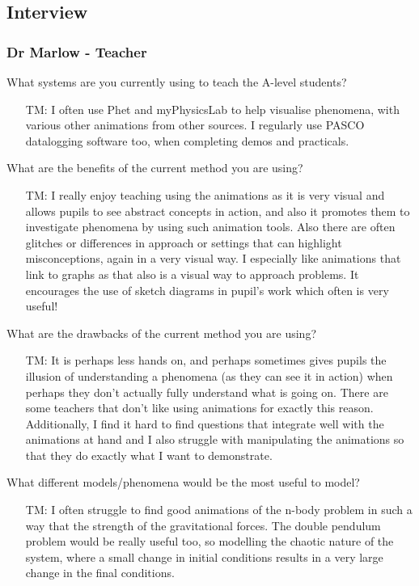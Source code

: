 \documentclass[12pt]{article}
\begin{document}
\newpage
\subsection{Interview}
\subsubsection{Dr Marlow - Teacher}

What systems are you currently using to teach the A-level students?
\begin{itemize}
    \item[TM: ] I often use Phet and myPhysicsLab to help visualise phenomena, with various other animations from other sources. I regularly use PASCO datalogging software too, when completing demos and practicals.
\end{itemize}
What are the benefits of the current method you are using?
\begin{itemize}
    \item[TM: ] I really enjoy teaching using the animations as it is very visual and allows pupils to see abstract concepts in action, and also it promotes them to investigate phenomena by using such animation tools. Also there are often glitches or differences in approach or settings that can highlight misconceptions, again in a very visual way. I especially like animations that link to graphs as that also is a visual way to approach problems. It encourages the use of sketch diagrams in pupil's work which often is very useful! 
\end{itemize}
What are the drawbacks of the current method you are using?
\begin{itemize}
    \item[TM: ] It is perhaps less hands on, and perhaps sometimes gives pupils the illusion of understanding a phenomena (as they can see it in action) when perhaps they don't actually fully understand what is going on. There are some teachers that don't like using animations for exactly this reason. Additionally, I find it hard to find questions that integrate well with the animations at hand and I also struggle with manipulating the animations so that they do exactly what I want to demonstrate.
\end{itemize}
What different models/phenomena would be the most useful to model?
\begin{itemize}
    \item[TM: ] I often struggle to find good animations of the n-body problem in such a way that the strength of the gravitational forces. The double pendulum problem would be really useful too, so modelling the chaotic nature of the system, where a small change in initial conditions results in a very large change in the final conditions.
\end{itemize}
\end{document}
